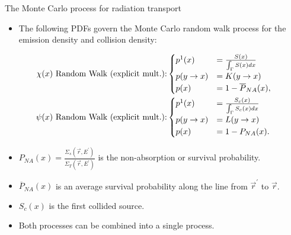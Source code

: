 \documentclass{beamer}
\begin{document}
\begin{frame}{The Monte Carlo process for radiation transport}

  \begin{itemize}
    \item The following PDFs govern the Monte Carlo random walk process
      for the emission density and collision density:
  \end{itemize}

  \begin{align}
    \chi(x)\text{ Random Walk (explicit mult.):} &
    \begin{cases}
      p^1(x) & = \frac{S(x)}{\int_{\Gamma} S(x)dx} \\
      p(y \to x) &  = K(y \to x) \\
      p(x) & = 1 - \overline{P}_{NA}(x),
    \end{cases} \nonumber \\ \medskip
    \psi(x)\text{ Random Walk (explicit mult.):} &
    \begin{cases}
      p^1(x) & = \frac{S_c(x)}{\int_{\Gamma} S_c(x)dx} \\
      p(y \to x) & = L(y \to x) \\
      p(x) & = 1 - P_{NA}(x).
    \end{cases}
    \nonumber
  \end{align}

  \begin{itemize}
    \item $P_{NA}(x) = \frac{\Sigma_s(\vec{r},E^{'})}{\Sigma_T(\vec{r},E^{'})}$ is
      the non-absorption or survival probability.
    \item $\overline{P}_{NA}(x)$ is an average survival probability along the 
      line from $\vec{r}^{'}$ to $\vec{r}$.
    \item $S_c(x)$ is the first collided source.
    \item Both processes can be combined into a single process.
  \end{itemize}
    
\end{frame}
\end{document}

